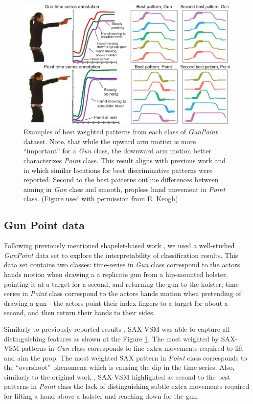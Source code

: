 \documentclass{llncs}
\newcommand{\myfigureshrinker}{\vspace{-1.1cm}}
\begin{document}
\begin{figure}[t]
   \myfigureshrinker
   \centering
   \includegraphics[width=115mm]{figures/gun-point.eps}
   \caption{Examples of best weighted patterns from each class of \textit{GunPoint} dataset. 
   Note, that while the upward arm motion is more ``important'' for a \textit{Gun} class, 
   the downward arm motion better characterizes \textit{Point} class. 
   This result aligns with previous work \cite{shapelet} and \cite{bagnal} in which similar 
   locations for best discriminative patterns were reported. 
   Second to the best patterns outline differences between aiming in \textit{Gun} class and
   smooth, propless hand movement in \textit{Point} class. 
   (Figure used with permission from E. Keogh)
   }
   \label{fig:shapelet-like-patterns}
\end{figure}

\subsection{Gun Point data}
Following previously mentioned shapelet-based work \cite{shapelet, bagnal}, 
we used a well-studied \textit{GunPoint} data set \cite{gun} to explore the 
interpretability of classification results. This data set contains two classes: 
time-series in \textit{Gun} class correspond to the actors hands motion when drawing a 
a replicate gun from a hip-mounted holster, pointing it at a target for a second,
and returning the gun to the holster; 
time-series in \textit{Point} class correspond to the actors hands motion when pretending
of drawing a gun - the actors point their index fingers to a target for about a second, 
and then return their hands to their sides. 

Similarly to previously reported results \cite{shapelet, bagnal}, 
SAX-VSM was able to capture all distinguishing features as shown at the 
Figure \ref{fig:shapelet-like-patterns}. The most weighted by SAX-VSM patterns in 
\textit{Gun} class corresponds to fine extra movements required to lift and aim the prop. 
The most weighted SAX pattern in \textit{Point} class corresponds to the ``overshoot''
phenomena which is causing the dip in the time series. 
Also, similarly to the original work \cite{gun}, SAX-VSM highlighted as second to the best
patterns in \textit{Point} class the lack of distinguishing subtle extra movements required
for lifting a hand above a holster and reaching down for the gun.
\end{document}
